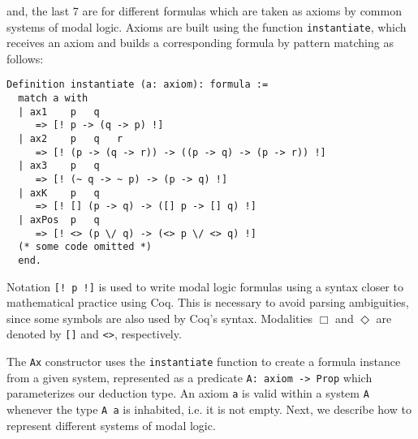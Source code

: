 \documentclass[sigconf]{acmart}
\begin{document}
and, the last 7 are for different formulas which are taken as axioms by common
systems of modal logic. Axioms are built using the function \texttt{instantiate},
which receives an axiom and builds a corresponding formula by pattern matching as
follows:
\begin{verbatim}
Definition instantiate (a: axiom): formula :=
  match a with
  | ax1    p   q
     => [! p -> (q -> p) !]
  | ax2    p   q   r
     => [! (p -> (q -> r)) -> ((p -> q) -> (p -> r)) !]
  | ax3    p   q
     => [! (~ q -> ~ p) -> (p -> q) !]
  | axK    p   q
     => [! [] (p -> q) -> ([] p -> [] q) !]
  | axPos  p   q
     => [! <> (p \/ q) -> (<> p \/ <> q) !]
  (* some code omitted *)
  end.
\end{verbatim}
Notation \texttt{[! p !]} is used to write modal logic formulas using a
syntax closer to mathematical practice using Coq. This is necessary to avoid
parsing ambiguities, since some symbols are also used by Coq's syntax.
Modalities $\Box$ and $\Diamond$ are denoted by \texttt{[]}
and \texttt{<>}, respectively.

The \texttt{Ax} constructor uses the \texttt{instantiate}
function to create a formula instance from a given system,
represented as a predicate
\texttt{A: axiom -> Prop} which parameterizes our deduction type. An
axiom \texttt{a} is valid within a system \texttt{A} whenever
the type \texttt{A a} is inhabited, i.e. it is not empty. Next, we
describe how to represent different systems of modal logic.
\end{document}
